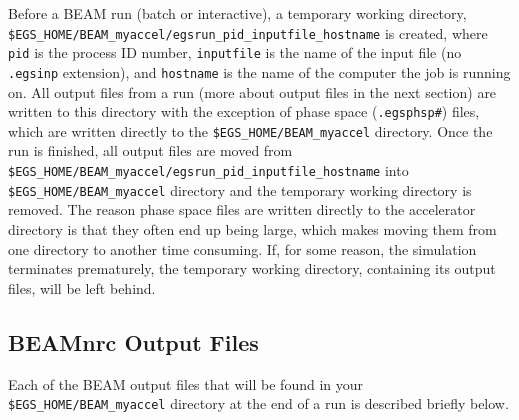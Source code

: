 \documentclass[12pt,twoside]{article}
\begin{document}
Before a BEAM run (batch or interactive), a temporary working directory,\\
{\tt \$EGS\_HOME/BEAM\_myaccel/egsrun\_pid\_inputfile\_hostname} is
created, where {\tt pid} is the process ID number, {\tt inputfile} is
the name of the input file (no {\tt .egsinp} extension), and {\tt hostname}
is the name of the computer the job is running on.  All output
files from a run (more about output files in the next section)
are written to this directory with the exception of
phase space ({\tt .egsphsp\#}) files, which are written directly to
the {\tt \$EGS\_HOME/BEAM\_myaccel} directory.  Once the run is finished,
all output files are moved from \\
{\tt \$EGS\_HOME/BEAM\_myaccel/egsrun\_pid\_inputfile\_hostname} into {\tt \$EGS\_HOME/BEAM\_myaccel} directory and the temporary
working directory is removed.  The reason phase space files are written
directly to the accelerator directory is that they often end up
being large, which makes moving them from one directory to another time
consuming.  If, for some reason, the simulation terminates prematurely, the temporary working directory, containing its output files, will be left behind.

\subsection{BEAMnrc Output Files}
\label{outputfilessect}

Each of the BEAM output
files that will be found in
your {\tt \$EGS\_HOME/BEAM\_myaccel} directory at the end of a run
is described briefly below.
\end{document}
